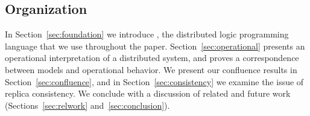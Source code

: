 \subsection{Organization}
In Section~\ref{sec:foundation} we introduce \lang, the distributed logic
programming language that we use throughout the paper.
Section~\ref{sec:operational} presents an operational interpretation of a
distributed system, and proves a correspondence between \lang models and
operational behavior.  We present our confluence results in
Section~\ref{sec:confluence}, and in Section~\ref{sec:consistency} we examine
the issue of replica consistency.  We conclude with a discussion of related and
future work (Sections~\ref{sec:relwork} and~\ref{sec:conclusion}).
